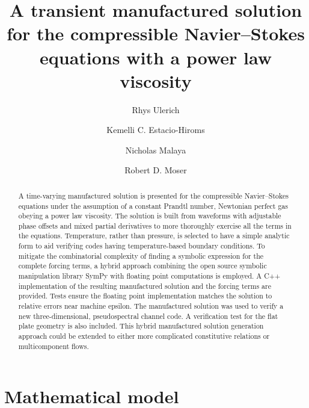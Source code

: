 \documentclass[10pt,reqno]{amsart}
\begin{document}
\title{
    A transient manufactured solution for the compressible Navier--Stokes
    equations with a power law viscosity
}
\author{Rhys Ulerich
        \and Kemelli C. Estacio-Hiroms
        \and Nicholas Malaya
        \and Robert D. Moser}

\begin{abstract}
A time-varying manufactured solution is presented for the compressible
Navier--Stokes equations under the assumption of a constant Prandtl number,
Newtonian perfect gas obeying a power law viscosity.  The solution is built
from waveforms with adjustable phase offsets and mixed partial derivatives to
more thoroughly exercise all the terms in the equations.  Temperature, rather
than pressure, is selected to have a simple analytic form to aid verifying
codes having temperature-based boundary conditions.  To mitigate the
combinatorial complexity of finding a symbolic expression for the complete
forcing terms, a hybrid approach combining the open source symbolic
manipulation library SymPy with floating point computations is employed.  A C++
implementation of the resulting manufactured solution and the forcing terms are
provided.  Tests ensure the floating point implementation matches the solution
to relative errors near machine epsilon.  The manufactured solution was used to
verify a new three-dimensional, pseudospectral channel code.  A verification
test for the flat plate geometry is also included.  This hybrid manufactured
solution generation approach could be extended to either more complicated
constitutive relations or multicomponent flows.
\end{abstract}

\maketitle

\section{Mathematical model}
\end{document}
